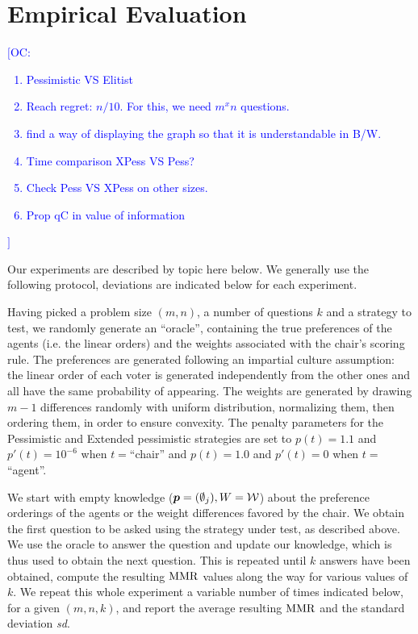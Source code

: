 \documentclass[sigconf, anonymous]{aamas}
\newcommand{\commentOC}[1]{\textcolor{blue}{\small$\big[$OC: #1$\big]$}}
\begin{document}
\section{Empirical Evaluation} 
\label{sec:experiments}
\commentOC{
	\begin{enumerate}
		\item Pessimistic VS Elitist
		\item Reach regret: $n/10$. For this, we need $m^x n$ questions. 
		\item find a way of displaying the graph so that it is understandable in B/W.
		\item Time comparison XPess VS Pess?
		\item Check Pess VS XPess on other sizes.
		\item Prop qC in value of information
	\end{enumerate}
}
Our experiments are described by topic here below. We generally use the following protocol, deviations are indicated below for each experiment.

Having picked a problem size $(m, n)$, a number of questions $k$ and a strategy to test, we randomly generate an “oracle”, containing the true preferences of the agents (i.e. the linear orders) and the weights associated with the chair's scoring rule. 
The preferences are generated following an impartial culture assumption: the linear order of each voter is generated independently from the other ones and all have the same probability of appearing. The weights are generated by drawing $m-1$ differences randomly with uniform distribution, normalizing them, then ordering them, in order to ensure convexity.
The penalty parameters for the Pessimistic and Extended pessimistic strategies are set to $p(t) = 1.1$ and $p'(t) = 10^{-6}$ when $t = $“chair” and $p(t) = 1.0$ and $p'(t) = 0$ when $t = $“agent”.

We start with empty knowledge (${\bm{p}} = (\emptyset_j), W = \mathcal{W}$) about the preference orderings of the agents or the weight differences favored by the chair. We obtain the first question to be asked using the strategy under test, as described above. We use the oracle to answer the question and update our knowledge, which is thus used to obtain the next question. This is repeated until $k$ answers have been obtained, compute the resulting $\operatorname{MMR}$ values along the way for various values of $k$. We repeat this whole experiment a variable number of times indicated below, for a given $(m, n, k)$, and report the average resulting $\operatorname{MMR}$ and the standard deviation \textit{sd}.
\end{document}
